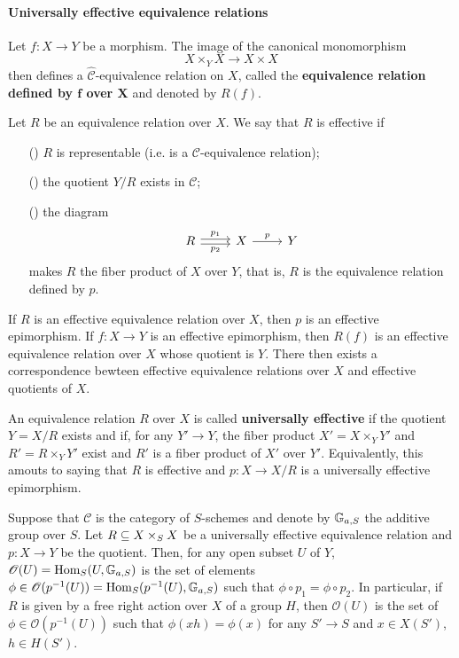 \paragraph{Universally effective equivalence relations}\label{category universally effective relation paragraph}
\begin{definition}
Let $f:X\to Y$ be a morphism. The image of the canonical monomorphism
\[X\times_YX\to X\times X\]
then defines a $\widehat{\mathcal{C}}$-equivalence relation on $X$, called the \textbf{equivalence relation defined by $\bm{f}$ over $\bm{X}$} and denoted by $R(f)$.
\end{definition}
\begin{definition}
Let $R$ be an equivalence relation over $X$. We say that $R$ is effective if
\begin{enumerate}
    \item[(\rmnum{1})] $R$ is representable (i.e. is a $\mathcal{C}$-equivalence relation);
    \item[(\rmnum{2})] the quotient $Y/R$ exists in $\mathcal{C}$;
    \item[(\rmnum{3})] the diagram
    \[\begin{tikzcd}
    R\ar[r,shift left=2pt,"p_1"]\ar[r,shift right=2pt,swap,"p_2"]&X\ar[r,"p"]&Y
    \end{tikzcd}\]
    makes $R$ the fiber product of $X$ over $Y$, that is, $R$ is the equivalence relation defined by $p$.
\end{enumerate}
\end{definition}
If $R$ is an effective equivalence relation over $X$, then $p$ is an effective epimorphism. If $f:X\to Y$ is an effective epimorphism, then $R(f)$ is an effective equivalence relation over $X$ whose quotient is $Y$. There then exists a correspondence bewteen effective equivalence relations over $X$ and effective quotients of $X$.

\begin{definition}
An equivalence relation $R$ over $X$ is called \textbf{universally effective} if the quotient $Y=X/R$ exists and if, for any $Y'\to Y$, the fiber product $X'=X\times_YY'$ and $R'=R\times_YY'$ exist and $R'$ is a fiber product of $X'$ over $Y'$. Equivalently, this amouts to saying that $R$ is effective and $p:X\to X/R$ is a universally effective epimorphism.
\end{definition}

\begin{remark}\label{category universal effective equivalence section is invariant}
Suppose that $\mathcal{C}$ is the category of $S$-schemes and denote by $\mathbb{G}_{a,S}$ the additive group over $S$. Let $R\subseteq X\times_SX$ be a universally effective equivalence relation and $p:X\to Y$ be the quotient. Then, for any open subset $U$ of $Y$, $\mathscr{O}(U)=\mathrm{Hom}_S(U,\mathbb{G}_{a,S})$ is the set of elements $\phi\in\mathscr{O}(p^{-1}(U))=\mathrm{Hom}_S(p^{-1}(U),\mathbb{G}_{a,S})$ such that $\phi\circ p_1=\phi\circ p_2$. In particular, if $R$ is given by a free right action over $X$ of a group $H$, then $\mathscr{O}(U)$ is the set of $\phi\in\mathscr{O}(p^{-1}(U))$ such that $\phi(xh)=\phi(x)$ for any $S'\to S$ and $x\in X(S')$, $h\in H(S')$. 
\end{remark}

